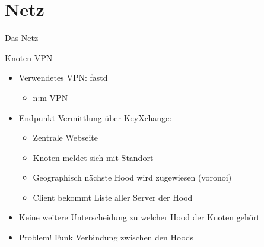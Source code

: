 \section{Netz}
\begin{frame}{}
    \begin{center}
        Das Netz
     \end{center}
\end{frame}

\begin{frame}{Knoten VPN}
    \begin{itemize}
        \item Verwendetes VPN: fastd
        \begin{itemize}
            \item n:m VPN
        \end{itemize}
        \item Endpunkt Vermittlung über KeyXchange:
        \begin{itemize}
            \item Zentrale Webseite 
            \item Knoten meldet sich mit Standort
            \item Geographisch nächste Hood wird zugewiesen (voronoi)
            \item Client bekommt Liste aller Server der Hood
        \end{itemize}
        \item<3> Keine weitere Unterscheidung zu welcher Hood der Knoten gehört
        \item<3> {\color{red}Problem!} Funk Verbindung zwischen den Hoods
    \end{itemize}
\end{frame}

